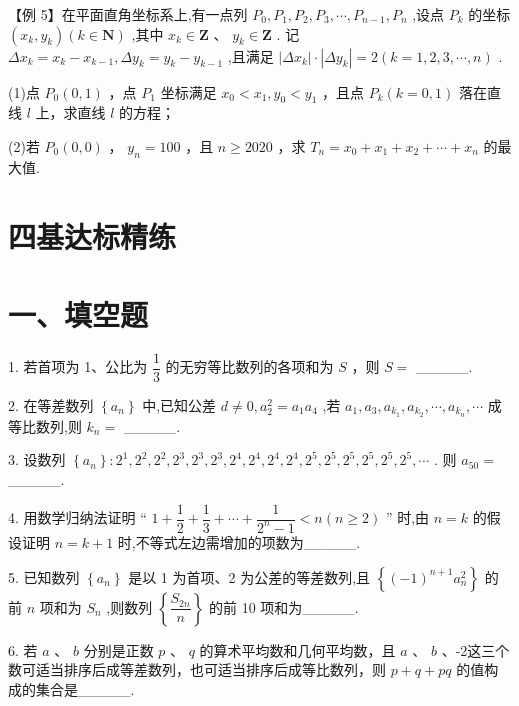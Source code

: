 【例 5】在平面直角坐标系上,有一点列 ${P}_{0},{P}_{1},{P}_{2},{P}_{3},\cdots ,{P}_{n - 1},{P}_{n}$ ,设点 ${P}_{k}$ 的坐标 $\left( {{x}_{k},{y}_{k}}\right) \left( {k \in  \mathbf{N}}\right)$ ,其中 ${x}_{k} \in  \mathbf{Z}$ 、 ${y}_{k} \in  \mathbf{Z}$ . 记 $\Delta {x}_{k} = {x}_{k} - {x}_{k - 1},\Delta {y}_{k} = {y}_{k} - {y}_{k - 1}$ ,且满足 $\left| {\Delta {x}_{k}}\right|  \cdot  \left| {\Delta {y}_{k}}\right|  = 2\left( {k = 1,2,3,\cdots ,n}\right)$ .

(1)点 ${P}_{0}\left( {0,1}\right)$ ，点 ${P}_{1}$ 坐标满足 ${x}_{0} < {x}_{1},{y}_{0} < {y}_{1}$ ，且点 ${P}_{k}\left( {k = 0,1}\right)$ 落在直线 $l$ 上，求直线 $l$ 的方程；

(2)若 ${P}_{0}\left( {0,0}\right)$ ， ${y}_{n} = {100}$ ，且 $n \geq  {2020}$ ，求 ${T}_{n} = {x}_{0} + {x}_{1} + {x}_{2} + \cdots  + {x}_{n}$ 的最大值.

\section*{四基达标精练}

\section*{一、填空题}

1. 若首项为 1、公比为 $\dfrac{1}{3}$ 的无穷等比数列的各项和为 $S$ ，则 $S =$ \_\_\_\_\_.

2. 在等差数列 $\left\{  {a}_{n}\right\}$ 中,已知公差 $d \neq  0,{a}_{2}^{2} = {a}_{1}{a}_{4}$ ,若 ${a}_{1},{a}_{3},{a}_{{k}_{1}},{a}_{{k}_{2}},\cdots ,{a}_{{k}_{n}},\cdots$ 成等比数列,则 ${k}_{n} =$ \_\_\_\_\_.

3. 设数列 $\left\{  {a}_{n}\right\}   : {2}^{1},{2}^{2},{2}^{2},{2}^{3},{2}^{3},{2}^{3},{2}^{4},{2}^{4},{2}^{4},{2}^{4},{2}^{5},{2}^{5},{2}^{5},{2}^{5},{2}^{5},{2}^{5},\cdots$ . 则 ${a}_{50} =$ \_\_\_\_\_.

4. 用数学归纳法证明 “ $1 + \dfrac{1}{2} + \dfrac{1}{3} + \cdots  + \dfrac{1}{{2}^{n} - 1} < n\left( {n \geq  2}\right)$ ” 时,由 $n = k$ 的假设证明 $n = k + 1$ 时,不等式左边需增加的项数为\_\_\_\_\_.

5. 已知数列 $\left\{  {a}_{n}\right\}$ 是以 1 为首项、2 为公差的等差数列,且 $\left\{  {{\left( -1\right) }^{n + 1}{a}_{n}^{2}}\right\}$ 的前 $n$ 项和为 ${S}_{n}$ ,则数列 $\left\{  \dfrac{{S}_{2n}}{n}\right\}$ 的前 10 项和为\_\_\_\_\_.

6. 若 $a$ 、 $b$ 分别是正数 $p$ 、 $q$ 的算术平均数和几何平均数，且 $a$ 、 $b$ 、-2这三个数可适当排序后成等差数列，也可适当排序后成等比数列，则 $p + q + {pq}$ 的值构成的集合是\_\_\_\_\_.

